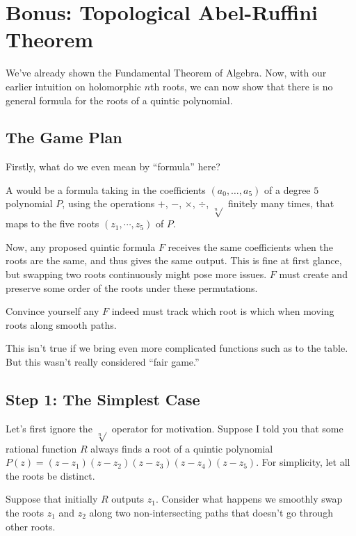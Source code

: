 \chapter{Bonus: Topological Abel-Ruffini Theorem}
\label{ch:abel_ruffini_theorem}
We've already shown the Fundamental Theorem of Algebra.
Now, with our earlier intuition on holomorphic $n$th roots,
we can now show that there is no general formula for
the roots of a quintic polynomial.

\section{The Game Plan}
Firstly, what do we even mean by ``formula'' here?

\begin{definition}
	A  would be a formula taking in the coefficients
	$(a_0, \dots, a_5)$ of a degree $5$ polynomial $P$,
	using the operations $+$, $-$, $\times$, $\div$, $\sqrt[n]{}$
	finitely many times, that maps to the five roots $(z_1, \cdots, z_5)$ of $P$.
\end{definition}

Now, any proposed quintic formula $F$ receives the same coefficients when the roots are the same,
and thus gives the same output. This is fine at first glance, but swapping two roots continuously
might pose more issues. $F$ must create and preserve some order of the roots under these permutations.

\begin{ques}
	Convince yourself any $F$ indeed must track which root is which when moving roots along
	smooth paths.
\end{ques}

\begin{remark}
	This isn't true if we bring even more complicated functions
	such as  to the table.
	But this wasn't really considered ``fair game.''
\end{remark}

\section{Step 1: The Simplest Case}
Let's first ignore the $\sqrt[n]{}$ operator for motivation.
Suppose I told you that some rational function $R$ always finds
a root of a quintic polynomial $P(z) = (z - z_1)(z - z_2)(z - z_3)(z - z_4)(z - z_5)$.
For simplicity, let all the roots be distinct.

Suppose that initially $R$ outputs $z_1$. Consider what happens we smoothly swap the roots $z_1$ and $z_2$
along two non-intersecting paths that doesn't go through other roots.

